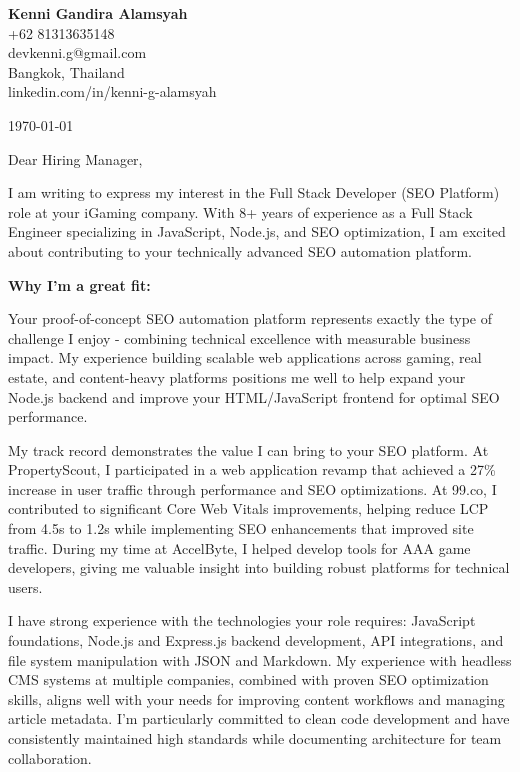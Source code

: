 \documentclass[12pt]{article}
\begin{document}
\begin{flushleft}

\textbf{Kenni Gandira Alamsyah} \\
+62 81313635148 \\
devkenni.g@gmail.com \\
Bangkok, Thailand \\
linkedin.com/in/kenni-g-alamsyah

\vspace{1cm}

\today

\vspace{1cm}

Dear Hiring Manager,

\vspace{0.5cm}

I am writing to express my interest in the Full Stack Developer (SEO Platform) role at your iGaming company. With 8+ years of experience as a Full Stack Engineer specializing in JavaScript, Node.js, and SEO optimization, I am excited about contributing to your technically advanced SEO automation platform.

\textbf{Why I'm a great fit:}

Your proof-of-concept SEO automation platform represents exactly the type of challenge I enjoy - combining technical excellence with measurable business impact. My experience building scalable web applications across gaming, real estate, and content-heavy platforms positions me well to help expand your Node.js backend and improve your HTML/JavaScript frontend for optimal SEO performance.

My track record demonstrates the value I can bring to your SEO platform. At PropertyScout, I participated in a web application revamp that achieved a 27\% increase in user traffic through performance and SEO optimizations. At 99.co, I contributed to significant Core Web Vitals improvements, helping reduce LCP from 4.5s to 1.2s while implementing SEO enhancements that improved site traffic. During my time at AccelByte, I helped develop tools for AAA game developers, giving me valuable insight into building robust platforms for technical users.

I have strong experience with the technologies your role requires: JavaScript foundations, Node.js and Express.js backend development, API integrations, and file system manipulation with JSON and Markdown. My experience with headless CMS systems at multiple companies, combined with proven SEO optimization skills, aligns well with your needs for improving content workflows and managing article metadata. I'm particularly committed to clean code development and have consistently maintained high standards while documenting architecture for team collaboration.


\end{flushleft}
\end{document}
